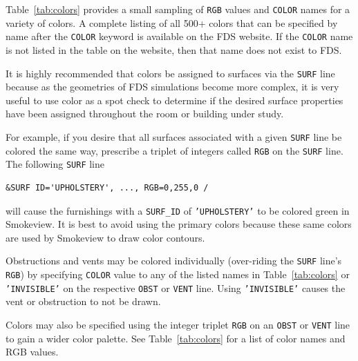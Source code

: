 \documentclass[11pt]{book}
\newcommand{\ct}{\tt\small}
\begin{document}
Table~\ref{tab:colors} provides a small sampling of {\ct RGB} values and {\ct COLOR} names
for a variety of colors. A complete listing of all 500+ colors that can be
specified by name after the {\ct COLOR} keyword is available on the FDS website.
If the {\ct COLOR} name is not listed in the table on the website, then that name does not exist to FDS.

It is highly recommended that colors be assigned to surfaces via the {\ct SURF} line because as
the geometries of FDS simulations become more complex, it is very useful
to use color as a spot check to determine if the desired
surface properties have been assigned throughout the room or building under study.

For example, if you desire that all surfaces associated with a
given {\ct SURF} line be colored the same way, prescribe a triplet of
integers called {\ct RGB} on the {\ct SURF} line. The following {\ct SURF} line

\footnotesize
\begin{verbatim}
&SURF ID='UPHOLSTERY', ..., RGB=0,255,0 /
\end{verbatim}
\normalsize

\noindent
will cause the furnishings with a {\ct SURF\_ID} of {\ct 'UPHOLSTERY'} to be colored green in Smokeview.
It is best to avoid using the primary colors because these same colors are
used by Smokeview to draw color contours.

Obstructions and vents may be colored individually (over-riding the
{\ct SURF} line's {\ct RGB}) by specifying {\ct COLOR} value to any of
the listed names in Table~\ref{tab:colors} or {\ct 'INVISIBLE'} on
the respective {\ct OBST} or {\ct VENT} line. Using {\ct 'INVISIBLE'}
causes the vent or obstruction to not be drawn.

Colors may also be specified using the integer triplet {\ct RGB} on an {\ct OBST} or {\ct VENT} line to gain
a wider color palette. See Table~\ref{tab:colors}
for a list of color names and RGB values.
\end{document}
